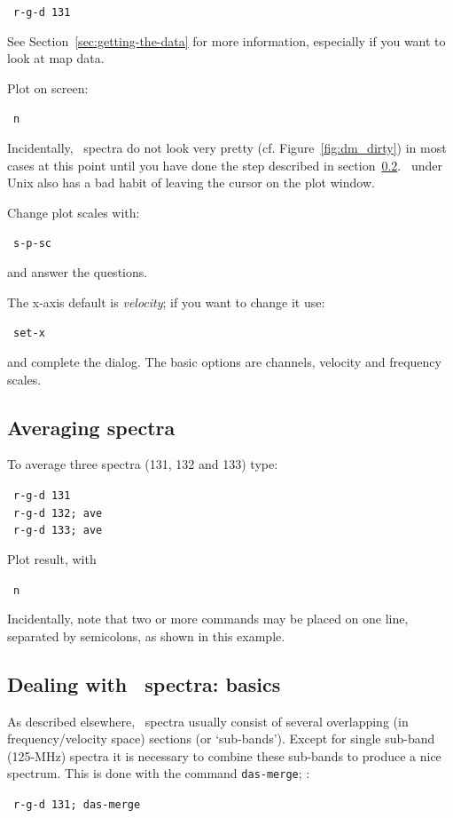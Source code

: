 \SP\ {\tt{r-g-d 131}}

See Section~\ref{sec:getting-the-data} for more information,
especially if you want to look at map data.

Plot on screen:

\SP\ {\tt{n}}

Incidentally, \das\ spectra do not look very pretty (cf.
Figure~\ref{fig:dm_dirty}) in most cases at this point until you have
done the step described in section~\ref{sec:subbands}. \SPECX\ under
Unix also has a bad habit of leaving the cursor on the plot window.

Change plot scales with:

\SP\ {\tt{s-p-sc}} 

and answer the questions.

The x-axis default is {\it{velocity}}; if you want to change it
use:

\SP\ {\tt{set-x}}

and complete the dialog. The basic options are channels, velocity and
frequency scales.


\subsection{Averaging spectra}
To average three spectra (131, 132 and 133) type:

\SP\ {\tt{r-g-d 131}}\\
\SP\ {\tt{r-g-d 132; ave}}\\
\SP\ {\tt{r-g-d 133; ave}}

Plot result, with 

\SP\ {\tt{n}}

Incidentally, note that two or more commands may be placed on one
line, separated by semicolons, as shown in this example.

\subsection{Dealing with \das\ spectra: basics}
\label{sec:subbands}
As described elsewhere, 
\das\ spectra usually
consist of several overlapping (in frequency/velocity space) sections
(or `sub-bands'). Except for single sub-band (125-MHz) spectra it is
necessary to combine these sub-bands to produce a nice spectrum. This
is done with the command {\tt{das-merge}}; \eg :

\SP\ {\tt r-g-d 131; das-merge}

